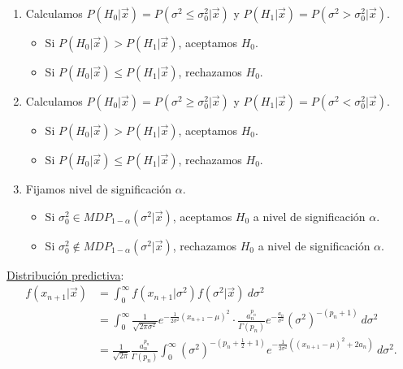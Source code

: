 \begin{enumerate}
    \item Calculamos $P(H_0 | \vec{x}) = P(\sigma^2\leq \sigma^2_0 |\vec{x})$ y $P(H_1 | \vec{x}) = P(\sigma^2 > \sigma^2_0 | \vec{x})$.
          \begin{itemize}
              \item Si $P(H_0 | \vec{x}) > P(H_1 | \vec{x})$, aceptamos $H_0$.
              \item Si $P(H_0 | \vec{x}) \leq P(H_1 | \vec{x})$, rechazamos $H_0$.
          \end{itemize}
    \item Calculamos $P(H_0 | \vec{x}) = P(\sigma^2 \ge \sigma^2_0 |\vec{x})$ y $P(H_1 | \vec{x}) = P(\sigma^2< \sigma^2_0 | \vec{x})$.
          \begin{itemize}
              \item Si $P(H_0 | \vec{x}) > P(H_1 | \vec{x})$, aceptamos $H_0$.
              \item Si $P(H_0 | \vec{x}) \leq P(H_1 | \vec{x})$, rechazamos $H_0$.
          \end{itemize}
    \item Fijamos nivel de significación $\alpha$.
          \begin{itemize}
              \item Si $\sigma^2_0 \in MDP_{1 - \alpha}(\sigma^2 | \vec{x})$, aceptamos $H_0$ a nivel de significación $\alpha$.
              \item Si $\sigma^2_0 \not\in MDP_{1 - \alpha}(\sigma^2| \vec{x})$, rechazamos $H_0$ a nivel de significación $\alpha$.
          \end{itemize}
\end{enumerate}
\underline{Distribución predictiva}:
\begin{align*}
    f(x_{n+1} | \vec{x}) & = \int_{0}^{\infty} f(x_{n+1} | \sigma^2) f(\sigma^2 | \vec{x}) \ d\sigma^2                                                                                                                             \\
                         & = \int_{0}^{\infty} \frac{1}{\sqrt{2\pi\sigma^2}} e^{- \frac{1}{2\sigma^2}(x_{n+1} - \mu)^2} \cdot \frac{a_n^{p_n}}{\Gamma(p_n)}e^{-\frac{a_n}{\sigma^2}}\left( \sigma^2 \right)^{-(p_n+1)} \ d\sigma^2 \\
                         & = \frac{1}{\sqrt{2\pi}}\frac{a_n^{p_n}}{\Gamma(p_n)} \int_{0}^{\infty} \left( \sigma^2 \right)^{-\left(p_n + \frac{1}{2} +1 \right)}e^{-\frac{1}{2\sigma^2}((x_{n+1} - \mu)^2 + 2a_n)} \ d\sigma^2.
\end{align*}
